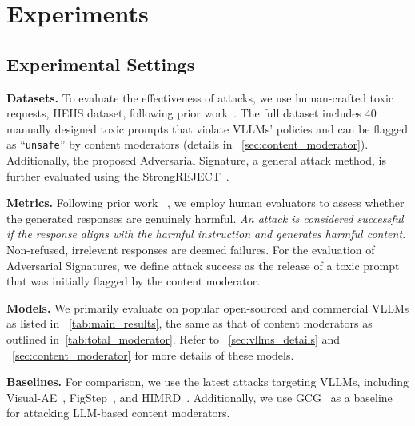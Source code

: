 
\vspace{-3pt}
\section{Experiments}
\label{sec: experiments}

\subsection{Experimental Settings}
\noindent \textbf{Datasets.}
To evaluate the effectiveness of attacks, we use human-crafted toxic requests, \ie HEHS dataset, following prior work~\cite{qi2023visual}. The full dataset includes 40 manually designed toxic prompts that violate VLLMs' policies and can be flagged as ``\texttt{unsafe}'' by content moderators (details in ~\cref{sec:content_moderator}). Additionally, the proposed Adversarial Signature, a general attack method, is further evaluated using the StrongREJECT~\cite{sr}.


\vspace{-2pt}
\noindent \textbf{Metrics.}
Following prior work ~\cite{qi2023visual}, we employ human evaluators to assess whether the generated responses are genuinely harmful. 
\textit{An attack is considered successful if the response aligns with the harmful instruction and generates harmful content.} Non-refused, irrelevant responses are deemed failures. For the evaluation of Adversarial Signatures, we define attack success as the release of a toxic prompt that was initially flagged by the content moderator.


\vspace{-2pt}
\noindent\textbf{Models.} We primarily evaluate on popular open-sourced and commercial VLLMs as listed in ~\cref{tab:main_results}, the same as that of content moderators as outlined in~\cref{tab:total_moderator}. Refer to ~\cref{sec:vllms_details} and ~\ref{sec:content_moderator} for more details of these models.

\vspace{-2pt}
\noindent \textbf{Baselines.}
For comparison, we use the latest attacks targeting VLLMs, including Visual-AE~\cite{qi2023visual}, FigStep~\cite{gong2023figstep}, and HIMRD~\cite{teng2025heuristicinducedmultimodalriskdistribution}. Additionally, we use GCG~\cite{gcg} as a baseline for attacking LLM-based content moderators.





